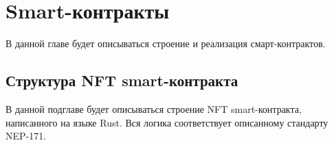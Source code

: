 

\section{Smart-контракты}
\label{section.4}

В данной главе будет описываться строение и реализация смарт-контрактов.

\subsection{Структура NFT smart-контракта}
\label{section.4.1}
В данной подглаве будет описываться строение NFT smart-контракта, написанного на языке Rust. Вся логика соответствует описанному стандарту NEP-171\cite{nftstandart}.
